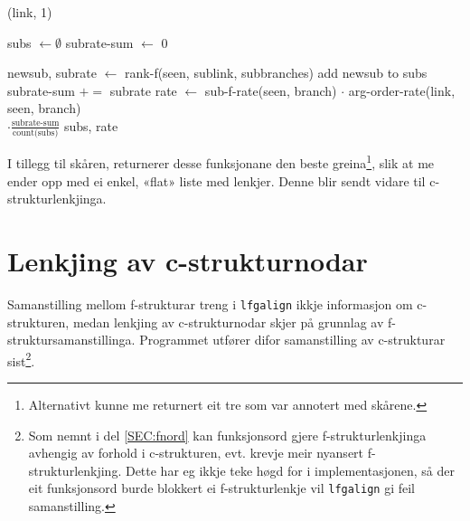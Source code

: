 \documentclass[11pt,a4paper,oneside,draft]{report}
\begin{document}
     \begin{algorithm}[]
      \caption{rank-f(seen, link, branches)}
      \label{algo:rank-f}

       {\Return (link, 1)}
      \end{algorithm}

      \begin{algorithm}[]
      subs $\gets \emptyset$ \;
      subrate-sum $\gets$ 0 \;
      \caption{rank-branch(seen, link, branch)}
      \label{algo:rank-branch}
         {
          newsub, subrate $\gets$ rank-f(seen, sublink, subbranches) \;
          add newsub to subs \;
          subrate-sum $+=$ subrate \;
        }
        rate $\gets$ sub-f-rate(seen, branch) $\cdot$ arg-order-rate(link, seen, branch) \\
        \hfill $\cdot \frac{\text{subrate-sum}}{\text{count(subs)}}$ \;
        \Return subs, rate \;
      \end{algorithm}

I tillegg til skåren, returnerer desse funksjonane den beste
greina\footnote{Alternativt kunne me returnert eit tre som var annotert med
        skårene. }, slik at me ender opp med ei enkel, «flat» liste med
lenkjer. Denne blir sendt vidare til c-strukturlenkjinga.


\section{Lenkjing av c-strukturnodar}
\label{sec-4.3}

Samanstilling mellom f-strukturar treng i \texttt{lfgalign} ikkje informasjon
om c-strukturen, medan lenkjing av c-strukturnodar skjer på grunnlag
av f-struktursamanstillinga. Programmet utfører difor samanstilling av
c-strukturar sist\footnote{Som nemnt i del \ref{SEC:fnord} kan funksjonsord gjere
       f-strukturlenkjinga avhengig av forhold i c-strukturen,
       evt. krevje meir nyansert f-strukturlenkjing. Dette har eg
       ikkje teke høgd for i implementasjonen, så der eit funksjonsord
       burde blokkert ei f-strukturlenkje vil \texttt{lfgalign} gi feil
       samanstilling. }.
\end{document}

